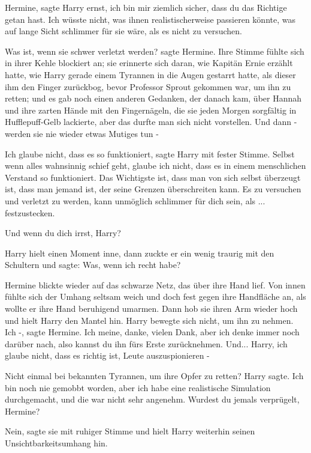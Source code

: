 \glqq{}Hermine\grqq{}, sagte Harry ernst, \glqq{}ich bin mir ziemlich sicher, dass
du das Richtige getan hast. Ich wüsste nicht, was ihnen realistischerweise
passieren könnte, was auf lange Sicht schlimmer für sie wäre, als es nicht zu
versuchen.\grqq{}

\glqq{}Was ist, wenn sie schwer verletzt werden?\grqq{} sagte Hermine. Ihre
Stimme fühlte sich in ihrer Kehle blockiert an; sie erinnerte sich daran, wie
Kapitän Ernie erzählt hatte, wie Harry gerade einem Tyrannen in die Augen
gestarrt hatte, als dieser ihm den Finger zurückbog, bevor Professor Sprout
gekommen war, um ihn zu retten; und es gab noch einen anderen Gedanken, der
danach kam, über Hannah und ihre zarten Hände mit den Fingernägeln, die sie
jeden Morgen sorgfältig in Hufflepuff-Gelb lackierte, aber das durfte man sich
nicht vorstellen. \glqq{}Und dann - werden sie nie wieder etwas Mutiges tun
-\grqq{}

\glqq{}Ich glaube nicht, dass es so funktioniert\grqq{}, sagte Harry mit fester
Stimme. \glqq{}Selbst wenn alles wahnsinnig schief geht, glaube ich nicht, dass
es in einem menschlichen Verstand so funktioniert. Das Wichtigste ist, dass man
von sich selbst überzeugt ist, dass man jemand ist, der seine Grenzen
überschreiten kann. Es zu versuchen und verletzt zu werden, kann unmöglich
schlimmer für dich sein, als ... festzustecken.\grqq{}

\glqq{}Und wenn du dich irrst, Harry?\grqq{}

Harry hielt einen Moment inne, dann zuckte er ein wenig traurig mit den
Schultern und sagte: \glqq{}Was, wenn ich recht habe?\grqq{}

Hermine blickte wieder auf das schwarze Netz, das über ihre Hand lief. Von innen
fühlte sich der Umhang seltsam weich und doch fest gegen ihre Handfläche an, als
wollte er ihre Hand beruhigend umarmen. Dann hob sie ihren Arm wieder hoch und
hielt Harry den Mantel hin. Harry bewegte sich nicht, um ihn zu nehmen. \glqq
Ich -\grqq{}, sagte Hermine. \glqq{}Ich meine, danke, vielen Dank, aber ich denke
immer noch darüber nach, also kannst du ihn fürs Erste zurücknehmen. Und...
Harry, ich glaube nicht, dass es richtig ist, Leute auszuspionieren -\grqq{}

\glqq{}Nicht einmal bei bekannten Tyrannen, um ihre Opfer zu retten?\grqq{} Harry
sagte. \glqq{}Ich bin noch nie gemobbt worden, aber ich habe eine realistische
Simulation durchgemacht, und die war nicht sehr angenehm. Wurdest du jemals
verprügelt, Hermine?\grqq{}

\glqq{}Nein\grqq{}, sagte sie mit ruhiger Stimme und hielt Harry weiterhin seinen
Unsichtbarkeitsumhang hin.

